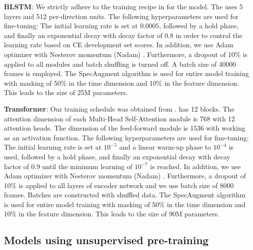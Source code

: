 \textbf{BLSTM}: We strictly adhere to the training recipe in \cite{RASR-hybrid_vs_attention} for the  model. 
The  uses 5 layers and 512 per-direction units. 
The following hyperparameters are used for fine-tuning: 
The initial learning rate is set at $0.0005$, followed by a hold phase, and finally an exponential decay with decay factor of 0.8 in order to control the learning rate based on CE development set scores.
In addition, we use Adam optimizer with Nesterov momentum (Nadam) \cite{dozat2016incorporating}.
Furthermore, a dropout of 10\% is applied to all modules and batch shuffling is turned off.
A batch size of 40000 frames is employed.
The SpecAugment \cite{park2019specaugment} algorithm is used for entire model training with masking of
50\% in the time dimension and 10\% in the feature dimension. 
This leads to the  size of 25M parameters.

\textbf{Transformer}: Our  training schedule was obtained from \cite{zeineldeen2022conformer, zeineldeen2022robustconformer}. 
 has 12 blocks.
The attention dimension of each Multi-Head Self-Attention module is 768 with 12 attention heads. 
The dimension of the feed-forward module is 1536 with  working as an activation function.
The following hyperparameters are used for fine-tuning: 
The initial learning rate is set at $10^{-5}$ and a linear warm-up phase to $10^{-4}$ is used, followed by a hold phase, and finally an exponential decay with decay factor of 0.9 until the minimum learning of $10^{-7}$ is reached.
In addition, we use Adam optimizer with Nesterov momentum (Nadam) \cite{dozat2016incorporating}.
Furthermore, a dropout of 10\% is applied to all layers of encoder network and we use batch size of 8000 frames.
Batches are constructed with shuffled data.
The SpecAugment \cite{park2019specaugment} algorithm is used for entire model training with masking of
50\% in the time dimension and 10\% in the feature dimension. 
This leads to the  size of 90M parameters.


\subsection{Models using unsupervised pre-training}

